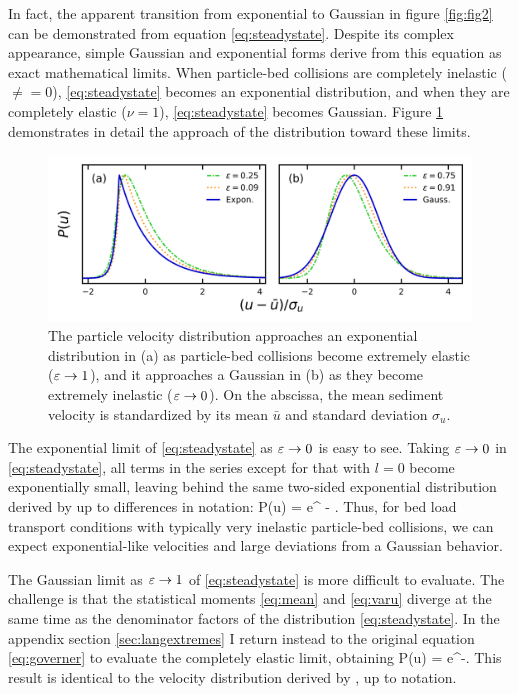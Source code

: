 In fact, the apparent transition from exponential to Gaussian in figure \ref{fig:fig2} can be demonstrated from equation \ref{eq:steadystate}. Despite its complex appearance, simple Gaussian and exponential forms derive from this equation as exact mathematical limits.
When particle-bed collisions are completely inelastic ($\ne = 0$), \ref{eq:steadystate} becomes an exponential distribution, and when they are completely elastic ($\nu = 1$), \ref{eq:steadystate} becomes Gaussian.
Figure \ref{fig:fig3} demonstrates in detail the approach of the distribution toward these limits.
\begin{figure}
	\centerline{\includegraphics{./figures/ch5/Fig3asymptotic.png}}
	\caption{The particle velocity distribution approaches an exponential distribution in (a) as particle-bed collisions become extremely elastic ($\varepsilon \rightarrow 1$), and it approaches a Gaussian in (b) as they become extremely inelastic ($\varepsilon \rightarrow 0$). On the abscissa, the mean sediment velocity is standardized by its mean $\bar{u}$ and standard deviation $\sigma_u$. }
	\label{fig:fig3}
\end{figure}

The exponential limit of \ref{eq:steadystate} as $\varepsilon \rightarrow 0$ is easy to see. Taking $\varepsilon \rightarrow 0 $ in \ref{eq:steadystate}, all terms in the series except for that with $l=0$ become exponentially small, leaving behind the same two-sided exponential distribution derived by \cite{Fan2014} up to differences in notation:
\be P(u) = e^{ - }. \ee
Thus, for bed load transport conditions with typically very inelastic particle-bed collisions, we can expect exponential-like velocities and large deviations from a Gaussian behavior.

The Gaussian limit as $\varepsilon \rightarrow 1$ of \ref{eq:steadystate} is more difficult to evaluate. The challenge is that the statistical moments \ref{eq:mean} and \ref{eq:varu} diverge at the same time as the denominator factors of the distribution \ref{eq:steadystate}. In the appendix section \ref{sec:langextremes} I return instead to the original equation \ref{eq:governer} to evaluate the completely elastic limit, obtaining
\be P(u) = e^{-}. \label{eq:gaussian}\ee
This result is identical to the velocity distribution derived by \citet{Ancey2014}, up to notation.

